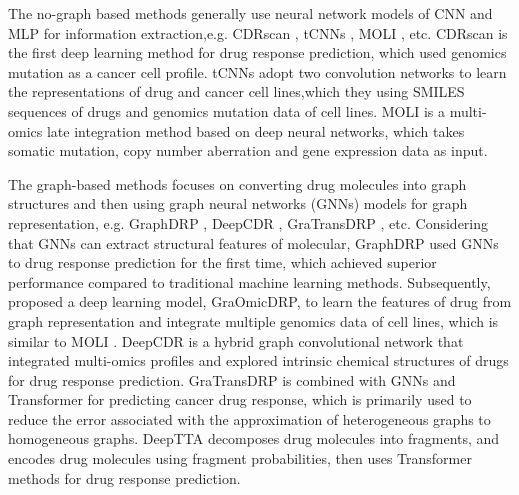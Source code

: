 \documentclass{article}
\begin{document}
The no-graph based methods generally use neural network models of CNN and MLP for information extraction,e.g. CDRscan \cite{CDRscan}, tCNNs \cite{tcnns},  MOLI \cite{MOLI}, etc.
CDRscan \cite{CDRscan} is the first  deep learning method for drug response prediction, which used genomics mutation as a cancer cell profile. tCNNs \cite{tcnns} adopt two convolution networks to learn the representations of drug and cancer cell lines,which they using  SMILES sequences of drugs and genomics mutation data of cell lines. MOLI \cite{MOLI} is a multi-omics late integration method based on deep neural networks, which takes somatic mutation, copy number aberration and gene expression data as input.

The graph-based methods focuses on converting drug molecules into graph structures and then using graph neural networks (GNNs) models for graph representation, e.g. GraphDRP  \cite{110bGCNforDRP}, DeepCDR \cite{DeepCDR}, GraTransDRP \cite{GraTransDRP}, etc. Considering that GNNs can extract  structural features of molecular, GraphDRP \cite{110bGCNforDRP} used GNNs to drug response prediction for the first time, which achieved superior performance compared to traditional machine learning methods.
Subsequently, \cite{18bMultipleOmic} proposed a deep learning model, GraOmicDRP, to learn the features of drug from graph representation and integrate multiple genomics data of cell lines, which is similar to MOLI \cite{MOLI}. DeepCDR  \cite{DeepCDR} is a hybrid graph convolutional network that integrated multi-omics profiles and explored intrinsic chemical structures of drugs for drug response prediction.
GraTransDRP \cite{GraTransDRP} is combined with GNNs and Transformer for predicting cancer drug response, which is primarily used to reduce the error associated with the approximation of heterogeneous graphs to homogeneous graphs. DeepTTA \cite{DeepTTC} decomposes drug molecules into fragments, and encodes drug molecules using fragment probabilities,  then uses Transformer methods for drug response prediction.
\end{document}
